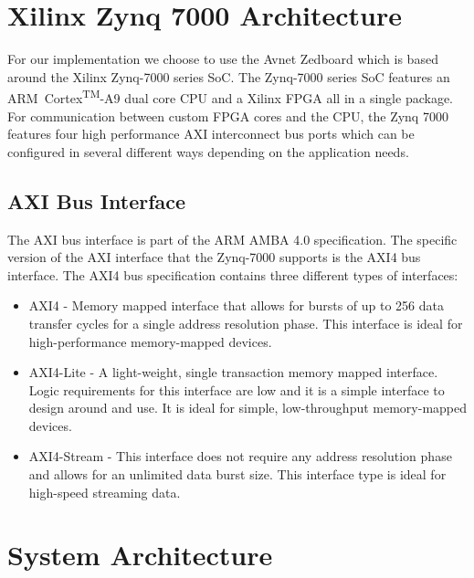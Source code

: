 \documentclass[journal]{IEEEtran}
\begin{document}
\section{Xilinx Zynq 7000 Architecture}
For our implementation we choose to use the Avnet Zedboard which is based around the Xilinx Zynq-7000 series SoC. The Zynq-7000 series SoC features an ARM\textregistered\ Cortex\textsuperscript{TM}-A9 dual core CPU and a Xilinx FPGA all in a single package. For communication between custom FPGA cores and the CPU, the Zynq 7000 features four high performance AXI interconnect bus ports which can be configured in several different ways depending on the application needs.




\subsection{AXI Bus Interface}
The AXI bus interface is part of the ARM AMBA 4.0 specification. The specific version of the AXI interface that the Zynq-7000 supports is the AXI4 bus interface. The AXI4 bus specification contains three different types of interfaces: \\

	\begin{itemize}
		
		\item AXI4 - Memory mapped interface that allows for bursts of up to 256 data transfer cycles for a single address resolution phase. This interface is ideal for high-performance memory-mapped devices.
		
		\item AXI4-Lite - A light-weight, single transaction memory mapped interface. Logic requirements for this interface are low and it is a simple interface to design around and use. It is ideal for simple, low-throughput memory-mapped devices.
		
		\item AXI4-Stream - This interface does not require any address resolution phase and allows for an unlimited data burst size. This interface type is ideal for high-speed streaming data.
		
	\end{itemize}



\section{System Architecture}
\end{document}
